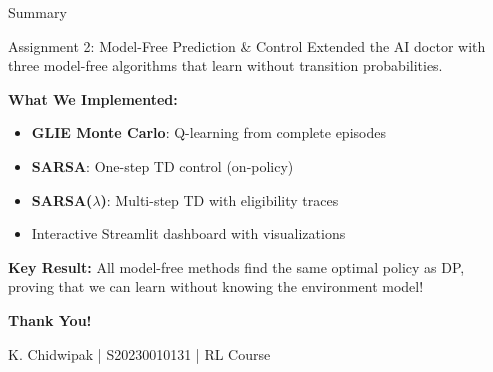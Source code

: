 \documentclass[aspectratio=169]{beamer}
\begin{document}
\begin{frame}{Summary}
    \begin{block}{Assignment 2: Model-Free Prediction \& Control}
        Extended the AI doctor with three model-free algorithms that learn without transition probabilities.
    \end{block}

    \vspace{0.3cm}

    \textbf{What We Implemented:}
    \begin{itemize}
        \item \textbf{GLIE Monte Carlo}: Q-learning from complete episodes
        \item \textbf{SARSA}: One-step TD control (on-policy)
        \item \textbf{SARSA($\lambda$)}: Multi-step TD with eligibility traces
        \item Interactive Streamlit dashboard with visualizations
    \end{itemize}

    \vspace{0.3cm}

    \textbf{Key Result:} All model-free methods find the same optimal policy as DP, proving that we can learn without knowing the environment model!

    \vspace{0.3cm}

    \begin{center}
        \textbf{Thank You!}

        \vspace{0.2cm}

        K. Chidwipak | S20230010131 | RL Course
    \end{center}
\end{frame}
\end{document}
